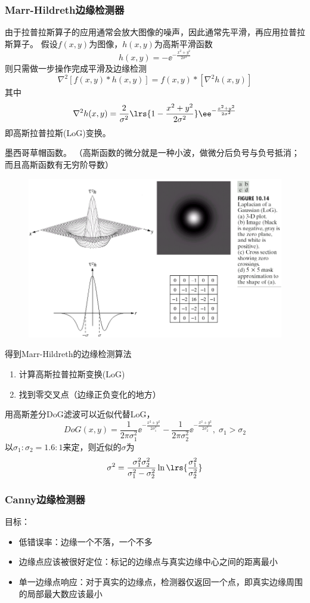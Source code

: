 \subsubsection{Marr-Hildreth边缘检测器}
由于拉普拉斯算子的应用通常会放大图像的噪声，因此通常先平滑，再应用拉普拉斯算子。
假设$f(x,y)$为图像，$h(x,y)$为高斯平滑函数
\[h(x,y)=-\ee^{-\frac{x^2+y^2}{2\sigma^2}}\]
则只需做一步操作完成平滑及边缘检测
\[\nabla^2 [f(x,y)*h(x,y)]=f(x,y)*[\nabla^2 h(x,y)]\]
其中
\[\nabla^2 h(x,y)=\frac{2}{\sigma^2}\lrs{1-\frac{x^2+y^2}{2\sigma^2}}\ee^{-\frac{x^2+y^2}{2\sigma^2}}\]
即高斯拉普拉斯(LoG)变换。

墨西哥草帽函数。
（高斯函数的微分就是一种小波，做微分后负号与负号抵消；而且高斯函数有无穷阶导数）
\begin{figure}[H]
\centering
\includegraphics[width=0.6\linewidth]{fig/LoG.png}
\end{figure}

得到Marr-Hildreth的边缘检测算法
\begin{enumerate}
	\item 计算高斯拉普拉斯变换(LoG)
	\item 找到零交叉点（边缘正负变化的地方）
\end{enumerate}

用高斯差分DoG滤波可以近似代替LoG，
\[DoG(x,y)=\frac{1}{2\pi\sigma_1^2}\ee^{-\frac{x^2+y^2}{2\sigma_1^2}}-\frac{1}{2\pi\sigma_2^2}\ee^{-\frac{x^2+y^2}{2\sigma_2^2}},\;\sigma_1>\sigma_2\]
以$\sigma_1:\sigma_2=1.6:1$来定，则近似的$\sigma$为
\[\sigma^2=\frac{\sigma_1^2\sigma_2^2}{\sigma_1^2-\sigma_2^2}\ln\lrs{\frac{\sigma_1^2}{\sigma_2^2}}\]

\subsubsection{Canny边缘检测器}
目标：
\begin{itemize}
	\item 低错误率：边缘一个不落，一个不多
	\item 边缘点应该被很好定位：标记的边缘点与真实边缘中心之间的距离最小
	\item 单一边缘点响应：对于真实的边缘点，检测器仅返回一个点，即真实边缘周围的局部最大数应该最小
\end{itemize}


